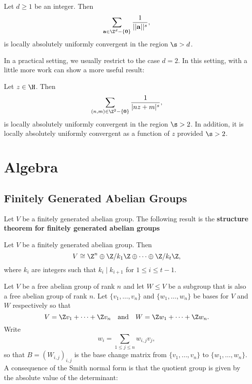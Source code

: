     \begin{theorem}
      Let $d \ge 1$ be an integer. Then
      \[
        \sum_{\mathbf{a} \in \Z^{d}-\{\mathbf{0}\}}\frac{1}{||\mathbf{a}||^{s}},
      \]
      is locally absolutely uniformly convergent in the region $\s > d$.
    \end{theorem}

    In a practical setting, we usually restrict to the case $d = 2$. In this setting, with a little more work can show a more useful result:

    \begin{proposition}\label{prop:general_lattice_sum_convergence_for_two_variables}
      Let $z \in \H$. Then
      \[
        \sum_{(n,m) \in \Z^{2}-\{\mathbf{0}\}}\frac{1}{|nz+m|^{s}},
      \]
      is locally absolutely uniformly convergent in the region $\s > 2$. In addition, it is locally absolutely uniformly convergent as a function of $z$ provided $\s > 2$.
    \end{proposition}
\chapter{Algebra}
  \section{Finitely Generated Abelian Groups}
    Let $V$ be a finitely generated abelian group. The following result is the \textbf{structure theorem for finitely generated abelian groups}

    \begin{theorem}
      Let $V$ be a finitely generated abelian group. Then
      \[
        V \cong \Z^{n} \oplus \Z/k_{1}\Z \oplus \cdots \oplus \Z/k_{t}\Z,
      \]
      where $k_{i}$ are integers such that $k_{i} \mid k_{i+1}$ for $1 \le i \le t-1$.
    \end{theorem}

    Let $V$ be a free abelian group of rank $n$ and let $W \le V$ be a subgroup that is also a free abelian group of rank $n$. Let $\{v_{1},\ldots,v_{n}\}$ and $\{w_{1},\ldots,w_{n}\}$ be bases for $V$ and $W$ respectively so that
    \[
      V = \Z v_{1}+\cdots+\Z v_{n} \quad \text{and} \quad W = \Z w_{1}+\cdots+\Z w_{n}.
    \]
    Write
    \[
      w_{i} = \sum_{1 \le j \le n}w_{i,j}v_{j},
    \]
    so that $B = (W_{i,j})_{i,j}$ is the base change matrix from $\{v_{1},\ldots,v_{n}\}$ to $\{w_{1},\ldots,w_{n}\}$. A consequence of the Smith normal form is that the quotient group is given by the absolute value of the determinant:

